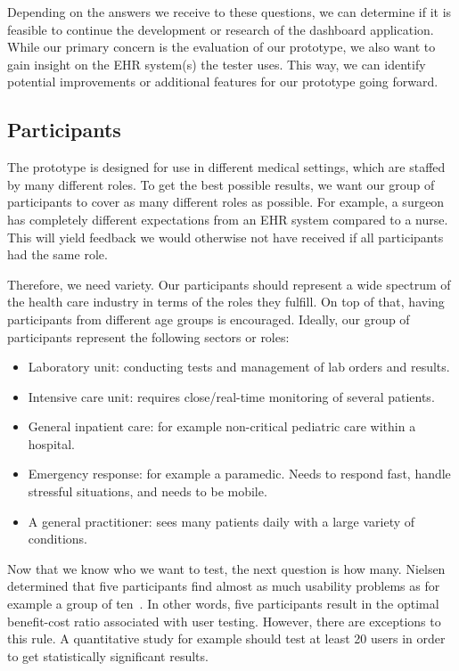     \noindent Depending on the answers we receive to these questions, we can determine if it is feasible to continue the development or research of the dashboard application. While our primary concern is the evaluation of our prototype, we also want to gain insight on the EHR system(s) the tester uses. This way, we can identify potential improvements or additional features for our prototype going forward. %

    \subsection{Participants}

    The prototype is designed for use in different medical settings, which are staffed by many different roles. To get the best possible results, we want our group of participants to cover as many different roles as possible. For example, a surgeon has completely different expectations from an EHR system compared to a nurse. This will yield feedback we would otherwise not have received if all participants had the same role.

    Therefore, we need variety. Our participants should represent a wide spectrum of the health care industry in terms of the roles they fulfill. On top of that, having participants from different age groups is encouraged. Ideally, our group of participants represent the following sectors or roles:
    \begin{itemize}
        \item Laboratory unit: conducting tests and management of lab orders and results.
        \item Intensive care unit: requires close/real-time monitoring of several patients.
        \item General inpatient care: for example non-critical pediatric care within a hospital.
        \item Emergency response: for example a paramedic. Needs to respond fast, handle stressful situations, and needs to be mobile.
        \item A general practitioner: sees many patients daily with a large variety of conditions.
    \end{itemize}

    \noindent Now that we know who we want to test, the next question is how many. Nielsen determined that five participants find almost as much usability problems as for example a group of ten~\cite{Nielsen2012}. In other words, five participants result in the optimal benefit-cost ratio associated with user testing. However, there are exceptions to this rule. A quantitative study for example should test at least 20 users in order to get statistically significant results.

